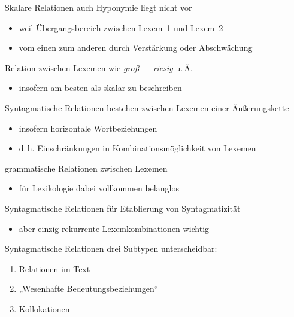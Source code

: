 \begin{frame}{Skalare Relationen}
\onslide<+->
auch Hyponymie liegt nicht vor
\begin{itemize}[<+->]
	\item		weil Übergangsbereich zwischen Lexem~1 und Lexem~2
	\item		vom einen zum anderen durch Verstärkung oder Abschwächung
\end{itemize}
\onslide<+->
\Zeile
Relation zwischen Lexemen wie \textit{groß} ― \textit{riesig} u.\,Ä.
\begin{itemize}[<+->]
	\item		insofern am besten als skalar zu beschreiben
\end{itemize}
\end{frame}

\begin{frame}{Syntagmatische Relationen}
\onslide<+->
bestehen zwischen Lexemen einer Äußerungskette
\begin{itemize}[<+->]
	\item		insofern horizontale Wortbeziehungen
	\item		d.\,h. Einschränkungen in Kombinationsmöglichkeit von Lexemen
\end{itemize}
\onslide<+->
\Zeile
grammatische Relationen zwischen Lexemen
\begin{itemize}[<+->]
	\item		für Lexikologie dabei vollkommen belanglos
\end{itemize}
\end{frame}

\begin{frame}{Syntagmatische Relationen}
\onslide<+->
für Etablierung von Syntagmatizität
\begin{itemize}[<+->]
	\item		aber einzig rekurrente Lexemkombinationen wichtig
\end{itemize}
\onslide<+->
\Zeile
\begin{exe}
	\ex\label{ex:syntagmatische.relationen-001}
    \begin{xlist}
		\onslide<+->
		\onslide<+->
	\end{xlist}
\end{exe}
\end{frame}

\begin{frame}{Syntagmatische Relationen}
\onslide<+->
drei Subtypen unterscheidbar:
\begin{enumerate}[<+->]
	\item		Relationen im Text
	\item		„Wesenhafte Bedeutungsbeziehungen“
	\item		Kollokationen
\end{enumerate}
\end{frame}

